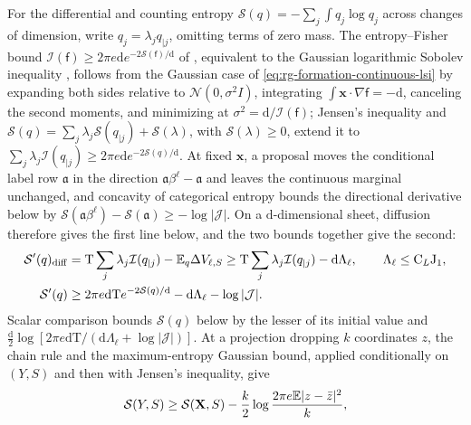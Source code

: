 For the differential and counting entropy
\(\mathcal S(q)=-\sum_j\int q_j\log q_j\) across changes of dimension, write
\(q_j=\lambda_jq_{\mid j}\), omitting terms of zero mass. The entropy--Fisher
bound \(\mathcal I(\mathsf f)\ge2\pi e \mathrm d e^{-2\mathcal S(\mathsf f)/\mathrm d}\)
of \citet{Stam1959}, equivalent to the Gaussian logarithmic Sobolev inequality
\citep{Carlen1991}, follows from the Gaussian case of
\cref{eq:rg-formation-continuous-lsi} by expanding both sides relative to
\(\mathcal N(0,\sigma^2I)\), integrating \(\int\mathbf x\cdot\nabla\mathsf f=-\mathrm d\),
canceling the second moments, and minimizing at
\(\sigma^2=\mathrm d/\mathcal I(\mathsf f)\); Jensen's inequality and
\(\mathcal S(q)=\sum_j\lambda_j\mathcal S(q_{\mid j})+\mathcal S(\lambda)\), with
\(\mathcal S(\lambda)\ge0\), extend it to
\(\sum_j\lambda_j\mathcal I(q_{\mid j})\ge2\pi e \mathrm d e^{-2\mathcal S(q)/\mathrm d}\).
At fixed \(\mathbf x\), a proposal moves the conditional label row
\(\mathfrak a\) in the direction \(\mathfrak a\beta^\ell-\mathfrak a\) and leaves
the continuous marginal unchanged, and concavity of categorical entropy bounds
the directional derivative below by
\(\mathcal S(\mathfrak a\beta^\ell)-\mathcal S(\mathfrak a)\ge-\log|\mathcal J|\).
On a \(\mathrm d\)-dimensional sheet, diffusion therefore gives the first line
below, and the two bounds together give the second:
\begin{align}
 \mathcal S'(q)_{\mathrm{diff}}
 &=\mathrm T\sum_j\lambda_j\mathcal I(q_{\mid j})-\mathbb E_q\Delta V_{\ell,S}
 \ge \mathrm T\sum_j\lambda_j\mathcal I(q_{\mid j})-\mathrm d\Lambda_\ell,
 \qquad \Lambda_\ell\le \mathrm C_L\mathrm J_1,
 \label{eq:rg-formation-actual-entropy-derivative}\\
 \mathcal S'(q)&\ge 2\pi e \mathrm d \mathrm T e^{-2\mathcal S(q)/\mathrm d}
                -\mathrm d\Lambda_\ell-\log|\mathcal J|.
 \label{eq:rg-formation-counting-entropy-floor}
\end{align}
Scalar comparison bounds \(\mathcal S(q)\) below by the lesser of its initial
value and
\(\frac{\mathrm d}2\log[2\pi e \mathrm d\mathrm T/(\mathrm d\Lambda_\ell+\log|\mathcal J|)]\).
At a projection dropping \(k\) coordinates \(z\), the chain rule and the
maximum-entropy Gaussian bound, applied conditionally on \((Y,S)\) and then
with Jensen's inequality, give
\begin{equation}
 \mathcal S(Y,S)\ge \mathcal S(\mathbf X,S)
       -\frac k2\log\frac{2\pi e \mathbb E|z-\bar z|^2}{k},
 \label{eq:rg-formation-entropy-projection}
\end{equation}

